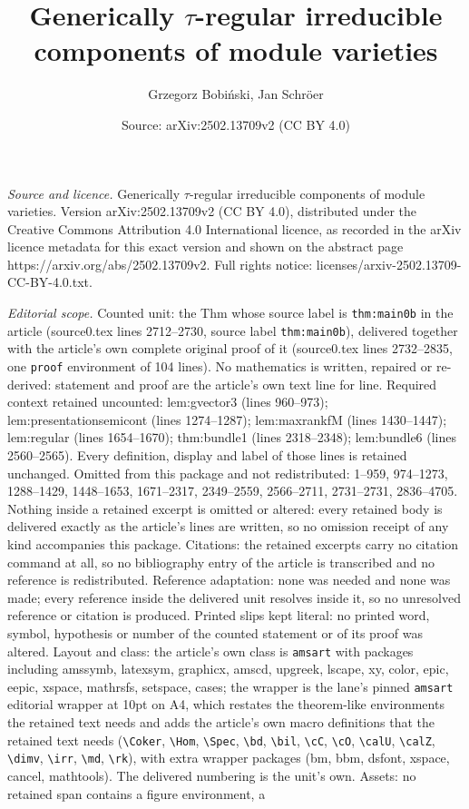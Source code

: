\documentclass[10pt,a4paper]{amsart}
\title[Generically $\tau$-regular irreducible components of module ]{Generically $\tau$-regular irreducible components of module varieties}
\author{Grzegorz Bobi\'nski, Jan Schr\"oer}
\date{Source: arXiv:2502.13709v2 (CC BY 4.0)}
\begin{document}
\maketitle

\noindent\emph{Source and licence.} Generically $\tau$-regular irreducible components of module varieties. Version arXiv:2502.13709v2 (CC BY 4.0), distributed under the Creative Commons Attribution 4.0 International licence, as recorded in the arXiv licence metadata for this exact version and shown on the abstract page https://arxiv.org/abs/2502.13709v2. Full rights notice: licenses/arxiv-2502.13709-CC-BY-4.0.txt.\par\smallskip

\noindent\textit{Editorial scope.} Counted unit: the Thm whose source label is \texttt{thm:main0b} in the article (source0.tex lines 2712--2730, source label \texttt{thm:main0b}), delivered together with the article's own complete original proof of it (source0.tex lines 2732--2835, one \texttt{proof} environment of 104 lines). No mathematics is written, repaired or re-derived: statement and proof are the article's own text line for line. Required context retained uncounted: lem:gvector3 (lines 960--973); lem:presentationsemicont (lines 1274--1287); lem:maxrankfM (lines 1430--1447); lem:regular (lines 1654--1670); thm:bundle1 (lines 2318--2348); lem:bundle6 (lines 2560--2565). Every definition, display and label of those lines is retained unchanged. Omitted from this package and not redistributed: 1--959, 974--1273, 1288--1429, 1448--1653, 1671--2317, 2349--2559, 2566--2711, 2731--2731, 2836--4705. Nothing inside a retained excerpt is omitted or altered: every retained body is delivered exactly as the article's lines are written, so no omission receipt of any kind accompanies this package. Citations: the retained excerpts carry no citation command at all, so no bibliography entry of the article is transcribed and no reference is redistributed. Reference adaptation: none was needed and none was made; every reference inside the delivered unit resolves inside it, so no unresolved reference or citation is produced. Printed slips kept literal: no printed word, symbol, hypothesis or number of the counted statement or of its proof was altered. Layout and class: the article's own class is \texttt{amsart} with packages including amssymb, latexsym, graphicx, amscd, upgreek, lscape, xy, color, epic, eepic, xspace, mathrsfs, setspace, cases; the wrapper is the lane's pinned \texttt{amsart} editorial wrapper at 10pt on A4, which restates the theorem-like environments the retained text needs and adds the article's own macro definitions that the retained text needs (\texttt{\textbackslash Coker}, \texttt{\textbackslash Hom}, \texttt{\textbackslash Spec}, \texttt{\textbackslash bd}, \texttt{\textbackslash bil}, \texttt{\textbackslash cC}, \texttt{\textbackslash cO}, \texttt{\textbackslash calU}, \texttt{\textbackslash calZ}, \texttt{\textbackslash dimv}, \texttt{\textbackslash irr}, \texttt{\textbackslash md}, \texttt{\textbackslash rk}), with extra wrapper packages (bm, bbm, dsfont, xspace, cancel, mathtools). The delivered numbering is the unit's own. Assets: no retained span contains a figure environment, a 
\end{document}
